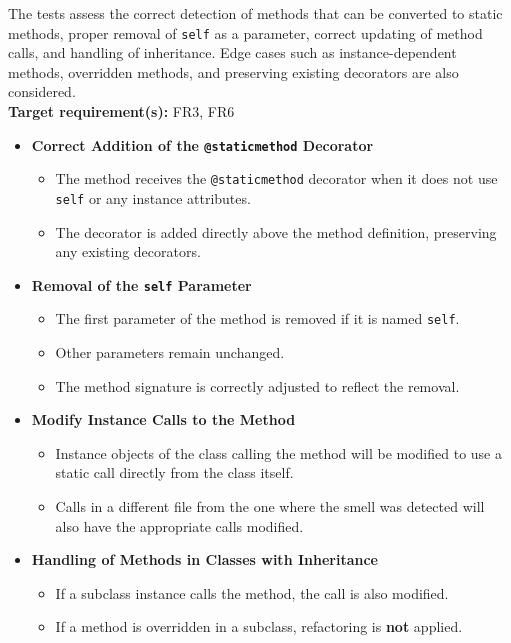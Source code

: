 \documentclass[12pt, titlepage]{article}
\begin{document}
\begin{enumerate}[label={\bf \textcolor{Maroon}{test-SRT-\arabic*}}, wide=0pt, font=\itshape]
\noindent The tests assess the correct detection of methods that can be converted to static methods, proper removal of \texttt{self} as a parameter, correct updating of method calls, and handling of inheritance. Edge cases such as instance-dependent methods, overridden methods, and preserving existing decorators are also considered.\\

\noindent \textbf{Target requirement(s):} FR3, FR6~\cite{SRS} \\

\begin{itemize}
    \item \textbf{Correct Addition of the \texttt{@staticmethod} Decorator}
    \begin{itemize}
        \item The method receives the \texttt{@staticmethod} decorator when it does not use \texttt{self} or any instance attributes.
        \item The decorator is added directly above the method definition, preserving any existing decorators.
    \end{itemize}

    \item \textbf{Removal of the \texttt{self} Parameter}
    \begin{itemize}
        \item The first parameter of the method is removed if it is named \texttt{self}.
        \item Other parameters remain unchanged.
        \item The method signature is correctly adjusted to reflect the removal.
    \end{itemize}

    \item \textbf{Modify Instance Calls to the Method}
    \begin{itemize}
        \item Instance objects of the class calling the method will be modified to use a static call directly from the class itself.
        \item Calls in a different file from the one where the smell was detected will also have the appropriate calls modified.
    \end{itemize}

    \item \textbf{Handling of Methods in Classes with Inheritance}
    \begin{itemize}
        \item If a subclass instance calls the method, the call is also modified.
        \item If a method is overridden in a subclass, refactoring is \textbf{not} applied.
    \end{itemize}


\end{itemize}
\end{enumerate}
\end{document}
